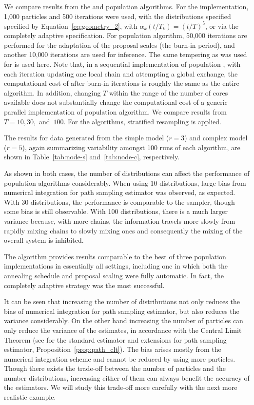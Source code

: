 We compare results from the \smc[2] and population \mcmc algorithms. For the
\smc implementation, 1,000 particles and 500 iterations were used, with the
distributions specified specified by Equation~\eqref{eq:geometry_2}, with
$\alpha_k(t/T_k) = (t/T)^5$, or via the completely adaptive specification.
For population \mcmc algorithm, 50,000 iterations are performed for the
adaptation of the proposal scales (the burn-in period), and another 10,000
iterations are used for inference. The same tempering as was used for \smc is
used here. Note that, in a sequential implementation of population \mcmc,
with each iteration updating one local chain and attempting a global
exchange, the computational cost of after burn-in iterations is roughly the
same as the entire \smc algorithm. In addition, changing $T$ within the range
of the number of cores available does not substantially change the
computational cost of a generic parallel implementation of population \mcmc
algorithm. We compare results from $T = 10,30,$ and~$100$. For the \smc
algorithms, stratified resampling is applied.

The results for data generated from the simple model ($r = 3$) and complex
model ($r = 5$), again summarizing variability amongst 100 runs of each
algorithm, are shown in Table~\ref{tab:node-s} and~\ref{tab:node-c},
respectively.

\afterpage{\clearpage}
\afterpage{\clearpage}

As shown in both cases, the number of distributions can affect the performance
of population \mcmc algorithms considerably. When using 10 distributions,
large bias from numerical integration for path sampling estimator was
observed, as expected. With 30 distributions, the performance is comparable to
the \smc[2] sampler, though some bias is still observable. With 100
distributions, there is a much larger variance because, with more chains, the
information travels more slowly from rapidly mixing chains to slowly mixing
ones and consequently the mixing of the overall system is inhibited.

The \smc algorithm provides results comparable to the best of
three population \mcmc implementations in essentially all settings, including
one in which both the annealing schedule and proposal scaling were fully
automatic. In fact, the completely adaptive strategy was the most successful.

It can be seen that increasing the number of distributions not only reduces
the bias of numerical integration for path sampling estimator, but also
reduces the variance considerably. On the other hand increasing the number of
particles can only reduce the variance of the estimates, in accordance with
the Central Limit Theorem (see \cite{DelMoral:2006hc} for the standard
estimator and extensions for path sampling estimator,
Proposition~\ref{prop:path_clt}). The bias arises mostly from the numerical
integration scheme and cannot be reduced by using more particles. Though there
exists the trade-off between the number of particles and the number
distributions, increasing either of them can always benefit the accuracy of
the estimators. We will study this trade-off more carefully with the next more
realistic example.

